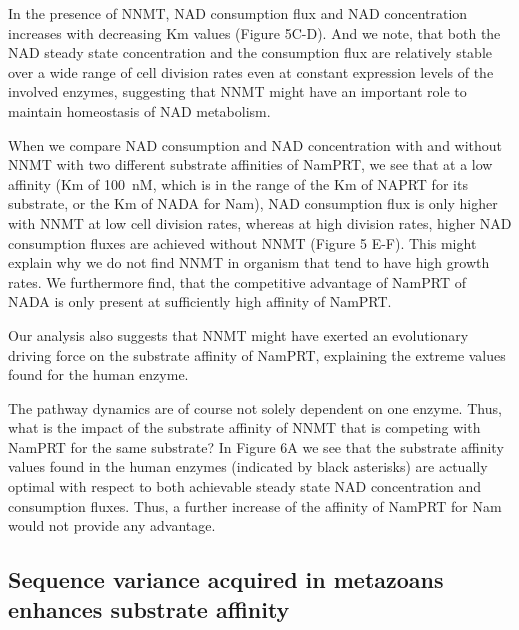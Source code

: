 \documentclass[paper=a4, 12pt]{scrartcl}
\begin{document}
In the presence of NNMT, NAD consumption flux and NAD concentration increases with decreasing Km values (Figure 5C-D). And we note, that both the NAD steady state concentration and the consumption flux are relatively stable over a wide range of cell division rates even at constant expression levels of the involved enzymes, suggesting that NNMT might have an important role to maintain homeostasis of NAD metabolism.

When we compare NAD consumption and NAD concentration with and without NNMT with two different substrate affinities of NamPRT, we see that at a low affinity (Km of 100 nM, which is in the range of the Km of NAPRT for its substrate, or the Km of NADA for Nam), NAD consumption flux is only higher with NNMT at low cell division rates, whereas at high division rates, higher NAD consumption fluxes are achieved without NNMT (Figure 5 E-F). This might explain why we do not find NNMT in organism that tend to have high growth rates. We furthermore find, that the competitive advantage of NamPRT of NADA is only present at sufficiently high affinity of NamPRT.

Our analysis also suggests that NNMT might have exerted an evolutionary driving force on the substrate affinity of NamPRT, explaining the extreme values found for the human enzyme.

The pathway dynamics are of course not solely dependent on one enzyme. Thus, what is the impact of the substrate affinity of NNMT that is competing with NamPRT for the same substrate? In Figure 6A we see that the substrate affinity values found in the human enzymes (indicated by black asterisks) are actually optimal with respect to both achievable steady state NAD concentration and consumption fluxes. Thus, a further increase of the affinity of NamPRT for Nam would not provide any advantage.


\subsection{Sequence variance acquired in metazoans enhances substrate affinity}
\end{document}
